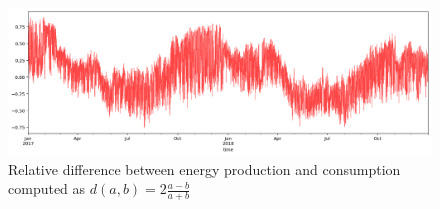 \documentclass[12pt]{report}
\begin{document}
{\begin{figure}
    \centering
    \includegraphics[width=\textwidth]{relative_difference.png}
    \caption{Relative difference between energy production and consumption computed as $d(a,b) = 2\frac{a-b}{a+b}$}
    \label{rel_dif}
\end{figure}



}
\end{document}

